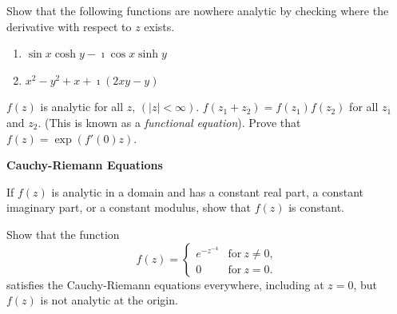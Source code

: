 {%
\begin{Exercise}
  \label{exercise x2y2x}
  Show that the following functions are nowhere analytic by checking where the
  derivative with respect to $z$ exists.  
  \begin{enumerate}
  \item $\sin x \cosh y - \imath \cos x \sinh y$
  \item $x^2 - y^2 + x + \imath (2 x y - y)$
  \end{enumerate}

\end{Exercise}







\begin{Exercise}
  \label{exercise f(z1+z2)=f(z1)f(z2)}
  $f(z)$ is analytic for all $z$, $(|z| < \infty)$.  
  $f\left( z_1 + z_2 \right) = f\left( z_1 \right)  f \left( z_2 \right)$ 
  for all $z_1$ and $z_2$.  (This is known
  as a \textit{functional equation}).  Prove that 
  $f(z) = \exp\left( f'(0) z \right)$.

\end{Exercise}




\begin{large}
  \noindent
  \textbf{Cauchy-Riemann Equations}
\end{large}





\begin{Exercise}
  \label{exercise constant real imaginary modulus}
  If $f(z)$ is analytic in a domain and has a constant real part,
  a constant imaginary part, or a constant modulus, show that $f(z)$ is 
  constant.

\end{Exercise}





\begin{Exercise}
  \label{exercise e-z-4}
  Show that the function
  \[
  f(z) = 
  \begin{cases}
    e^{-z^{-4}} &\mathrm{for}\ z \neq 0, 
    \\
    0 &\mathrm{for}\ z = 0.
  \end{cases}
  \]
  satisfies the Cauchy-Riemann equations everywhere, including at $z = 0$,
  but $f(z)$ is not analytic at the origin.


\end{Exercise}}
